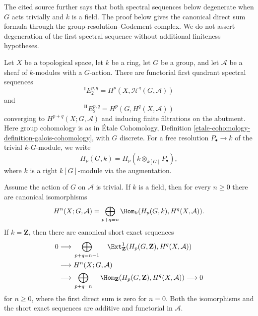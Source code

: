 \begin{lemma}
\label{lemma-sheaf-group-operator-spectral-sequences}
\begin{reference}
\cite[Chapter IV, \S 4.4, Theorem 4.4.1, p. 194]{Tohoku}
\end{reference}
\begin{history}
The cited source further says that both spectral sequences below degenerate
when $G$ acts trivially and $k$ is a field. The proof below gives the
canonical direct sum formula through the group-resolution--Godement complex.
We do not assert degeneration of the first spectral sequence without
additional finiteness hypotheses.
\end{history}
Let $X$ be a topological space, let $k$ be a ring, let $G$ be a group, and
let $\mathcal{A}$ be a sheaf of $k$-modules with a $G$-action. There are
functorial first quadrant spectral sequences
$$
{}^{\mathrm I}E_2^{p, q} =
H^p(X, \mathcal{H}^q(G, \mathcal{A}))
$$
and
$$
{}^{\mathrm{II}}E_2^{p, q} =
H^p(G, H^q(X, \mathcal{A}))
$$
converging to $H^{p + q}(X; G, \mathcal{A})$ and inducing finite
filtrations on the abutment. Here group cohomology is as in \'Etale
Cohomology, Definition
\ref{etale-cohomology-definition-galois-cohomology}, with $G$ discrete.
For a free resolution $P_\bullet \to k$ of the trivial $k\text{-}G$-module,
we write
$$
H_p(G, k) = H_p(k \otimes_{k[G]} P_\bullet),
$$
where $k$ is a right $k[G]$-module via the augmentation.

Assume the action of $G$ on $\mathcal{A}$ is trivial. If $k$ is a field,
then for every $n \geq 0$ there are canonical isomorphisms
$$
H^n(X; G, \mathcal{A}) =
\bigoplus_{p + q = n}
\Hom_k(H_p(G, k), H^q(X, \mathcal{A})).
$$
If $k = \mathbf{Z}$, then there are canonical short exact sequences
$$
\begin{aligned}
0 \longrightarrow{}&
\bigoplus_{p + q = n - 1}\quad
\Ext_{\mathbf{Z}}^1(H_p(G, \mathbf{Z}), H^q(X, \mathcal{A})) \\
\longrightarrow{}& H^n(X; G, \mathcal{A}) \\
\longrightarrow{}&
\bigoplus_{p + q = n}\quad
\Hom_{\mathbf{Z}}(H_p(G, \mathbf{Z}), H^q(X, \mathcal{A}))
\longrightarrow 0
\end{aligned}
$$
for $n \geq 0$, where the first direct sum is zero for $n = 0$.
Both the isomorphisms and the short exact sequences are additive and
functorial in $\mathcal{A}$.
\end{lemma}

